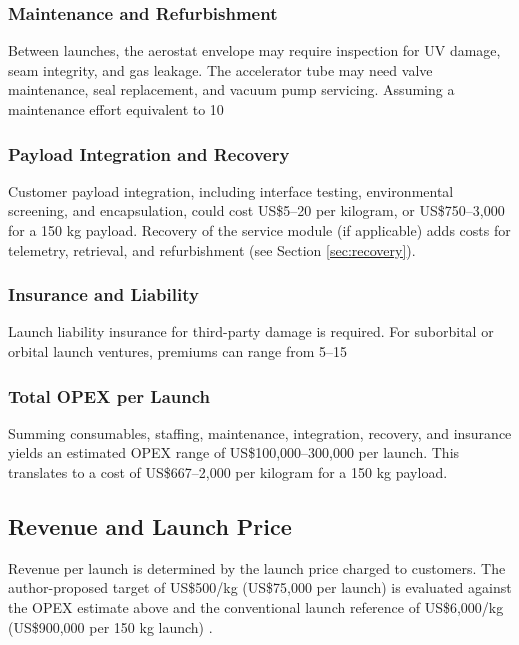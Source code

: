 \subsubsection{Maintenance and Refurbishment}
Between launches, the aerostat envelope may require inspection for UV damage, seam integrity, and gas leakage. The accelerator tube may need valve maintenance, seal replacement, and vacuum pump servicing. Assuming a maintenance effort equivalent to 10%

\subsubsection{Payload Integration and Recovery}
Customer payload integration, including interface testing, environmental screening, and encapsulation, could cost US\$5–20 per kilogram, or US\$750–3,000 for a 150 kg payload. Recovery of the service module (if applicable) adds costs for telemetry, retrieval, and refurbishment (see Section \ref{sec:recovery}).

\subsubsection{Insurance and Liability}
Launch liability insurance for third-party damage is required. For suborbital or orbital launch ventures, premiums can range from 5–15%

\subsubsection{Total OPEX per Launch}
Summing consumables, staffing, maintenance, integration, recovery, and insurance yields an estimated OPEX range of US\$100,000–300,000 per launch. This translates to a cost of US\$667–2,000 per kilogram for a 150 kg payload.

\subsection{Revenue and Launch Price}
Revenue per launch is determined by the launch price charged to customers. The author-proposed target of US\$500/kg (US\$75,000 per launch) is evaluated against the OPEX estimate above and the conventional launch reference of US\$6,000/kg (US\$900,000 per 150 kg launch) \cite{faa_launch_cost_survey}.

